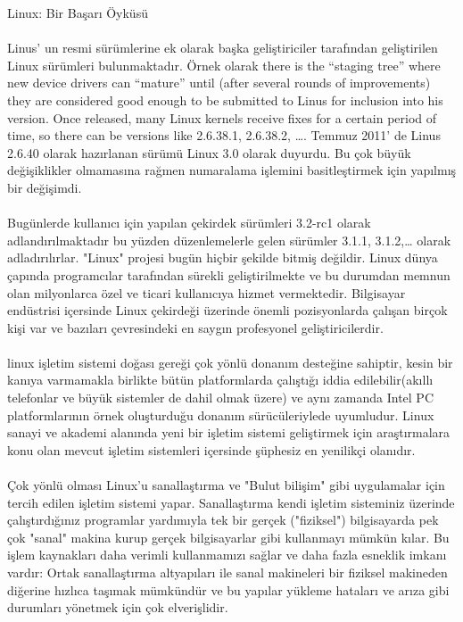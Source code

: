 \documentclass[10pt,a5paper]{book}
\begin{document}
\begin{section}{Linux: Bir Başarı Öyküsü}
\paragraph{}{Linus’ un resmi sürümlerine ek olarak başka geliştiriciler tarafından geliştirilen Linux sürümleri bulunmaktadır. Örnek olarak there is the “staging tree” where new device drivers can “mature” until (after several rounds of improvements) they are considered good enough to be submitted to Linus for inclusion into his version. Once released, many Linux kernels receive fixes for a
certain period of time, so there can be versions like 2.6.38.1, 2.6.38.2, ….
Temmuz 2011’ de Linus 2.6.40 olarak hazırlanan sürümü Linux 3.0 olarak duyurdu. Bu çok büyük değişiklikler olmamasına rağmen numaralama işlemini basitleştirmek için yapılmış bir değişimdi.}
\paragraph{}{Bugünlerde kullanıcı için yapılan çekirdek sürümleri 3.2-rc1 olarak adlandırılmaktadır bu yüzden düzenlemelerle gelen sürümler 3.1.1, 3.1.2,… olarak adladırılırlar. "Linux" projesi bugün hiçbir şekilde bitmiş değildir. Linux dünya çapında programcılar tarafından sürekli geliştirilmekte ve bu  durumdan memnun olan milyonlarca özel ve ticari kullanıcıya hizmet vermektedir. Bilgisayar endüstrisi içersinde  Linux çekirdeği üzerinde  önemli pozisyonlarda çalışan birçok kişi var ve bazıları çevresindeki en saygın profesyonel geliştiricilerdir.}
\paragraph{}{linux işletim sistemi doğası gereği çok yönlü donanım desteğine sahiptir, kesin bir kanıya varmamakla birlikte bütün platformlarda çalıştığı iddia edilebilir(akıllı telefonlar ve büyük sistemler de dahil olmak üzere) ve aynı zamanda Intel PC platformlarının örnek oluşturduğu donanım sürücüleriylede uyumludur. Linux sanayi ve akademi alanında  yeni bir işletim sistemi geliştirmek için araştırmalara konu olan  mevcut işletim sistemleri içersinde şüphesiz en yenilikçi olanıdır.}
\paragraph{}{Çok yönlü olması Linux'u sanallaştırma ve "Bulut bilişim" gibi uygulamalar için tercih edilen işletim sistemi yapar. Sanallaştırma kendi işletim sisteminiz üzerinde çalıştırdığınız programlar yardımıyla tek bir gerçek ("fiziksel") bilgisayarda  pek çok "sanal" makina kurup  gerçek bilgisayarlar gibi kullanmayı mümkün kılar. Bu işlem kaynakları daha verimli kullanmamızı sağlar ve daha fazla esneklik imkanı vardır: Ortak sanallaştırma altyapıları ile sanal makineleri bir fiziksel makineden diğerine hızlıca taşımak mümkündür ve bu yapılar yükleme hataları ve arıza gibi durumları yönetmek için çok elverişlidir.}

\end{section}
\end{document}
